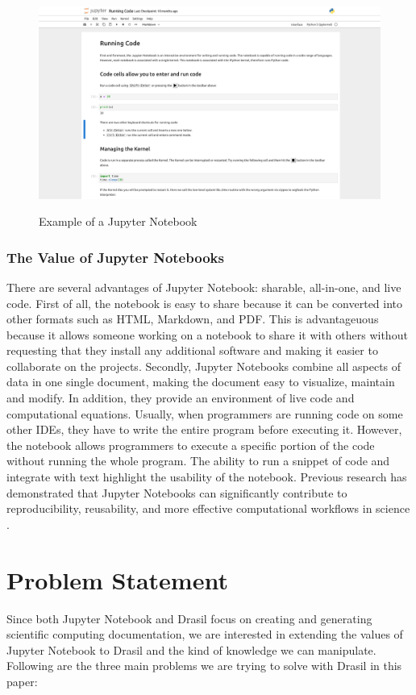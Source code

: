 \begin{figure}[h!]
	\caption{Example of a Jupyter Notebook}
	\includegraphics[width=1\textwidth]{figures/running_code.png}
	\label{fig:running_code}
\end{figure}

\subsubsection{The Value of Jupyter Notebooks}
There are several advantages of Jupyter Notebook: sharable, all-in-one, and 
live code. First of all, the notebook is easy to share because it can be 
converted into other formats such as HTML, Markdown, and PDF. This is 
advantageuous because it allows someone working on a notebook to share it with 
others without requesting that they install any additional software and making 
it easier to collaborate on the projects. Secondly, Jupyter Notebooks combine 
all aspects of data in one single document, making the document easy to 
visualize, maintain and modify. In addition, they provide an environment of 
live code and computational equations. Usually, when programmers are running 
code on some other IDEs, they have to write the entire program before executing 
it. However, the notebook allows programmers to execute a specific portion of 
the code without running the whole program. The ability to run a snippet of 
code and integrate with text highlight the usability of the notebook. Previous 
research has demonstrated that Jupyter Notebooks can significantly contribute 
to reproducibility, reusability, and more effective computational workflows in 
science \cite{beg2021using}.

\section{Problem Statement}
Since both Jupyter Notebook and Drasil focus on creating and generating 
scientific computing documentation, we are interested in extending the values 
of Jupyter Notebook to Drasil and the kind of knowledge we can manipulate. 
Following are the three main problems we are trying to solve with Drasil in 
this paper:

